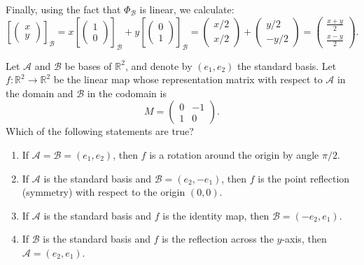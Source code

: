 \begin{example}
Finally, using the fact that $\Phi_{\mathcal{B}}$ is linear, we calculate:
\[
\left[\begin{pmatrix} x \\ y \end{pmatrix}\right]_{\mathcal{B}} = x \left[\begin{pmatrix} 1 \\ 0 \end{pmatrix}\right]_{\mathcal{B}} + y \left[\begin{pmatrix} 0 \\ 1 \end{pmatrix}\right]_{\mathcal{B}} = \begin{pmatrix} x/2 \\ x/2 \end{pmatrix} + \begin{pmatrix} y/2 \\ -y/2 \end{pmatrix} = \begin{pmatrix} \frac{x+y}{2} \\ \frac{x-y}{2} \end{pmatrix}.
\]
\end{example}

\begin{exercise}
\label{exc:geometric_interpretation_matrix_mc}
Let $\mathcal{A}$ and $\mathcal{B}$ be bases of $\mathbb{R}^2$, and denote by $(e_1, e_2)$ the standard basis. Let $f \colon \mathbb{R}^2 \to \mathbb{R}^2$ be the linear map whose representation matrix with respect to $\mathcal{A}$ in the domain and $\mathcal{B}$ in the codomain is
\[
M = \begin{pmatrix} 0 & -1 \\ 1 & 0 \end{pmatrix}.
\]
Which of the following statements are true?
\begin{enumerate}[label=\textbf{(\alph*)}]
    \item If $\mathcal{A} = \mathcal{B} = (e_1, e_2)$, then $f$ is a rotation around the origin by angle $\pi/2$.
    \item If $\mathcal{A}$ is the standard basis and $\mathcal{B} = (e_2, -e_1)$, then $f$ is the point reflection (symmetry) with respect to the origin $(0, 0)$.
    \item If $\mathcal{A}$ is the standard basis and $f$ is the identity map, then $\mathcal{B} = (-e_2, e_1)$.
    \item If $\mathcal{B}$ is the standard basis and $f$ is the reflection across the $y$-axis, then $\mathcal{A} = (e_2, e_1)$.
\end{enumerate}
\end{exercise}

